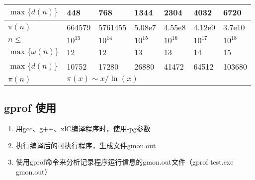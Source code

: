 \documentclass[twoside,twocolumn]{article}
\begin{document}
\begin{table}[H]
{\begin{tabular}{|l|llllll|}
$\max\{d(n)\}$      & \multicolumn{1}{l|}{448}                             & \multicolumn{1}{l|}{768}                             & \multicolumn{1}{l|}{1344}                            & \multicolumn{1}{l|}{2304}                              & \multicolumn{1}{l|}{4032}                            & 6720                           \\ \hline
$\pi(n)$            & \multicolumn{1}{l|}{664579}                          & \multicolumn{1}{l|}{5761455}                         & \multicolumn{1}{l|}{5.08e7}                          & \multicolumn{1}{l|}{4.55e8}                            & \multicolumn{1}{l|}{4.12e9}                          & 3.7e10                         \\ \hline
\rowcolor[HTML]{C0C0C0} 
$n\le$              & \multicolumn{1}{l|}{\cellcolor[HTML]{C0C0C0}$10^{13}$} & \multicolumn{1}{l|}{\cellcolor[HTML]{C0C0C0}$10^{14}$} & \multicolumn{1}{l|}{\cellcolor[HTML]{C0C0C0}$10^{15}$} & \multicolumn{1}{l|}{\cellcolor[HTML]{C0C0C0}$10^{16}$}   & \multicolumn{1}{l|}{\cellcolor[HTML]{C0C0C0}$10^{17}$} & $10^{18}$                        \\ \hline
$\max\{\omega(n)\}$ & \multicolumn{1}{l|}{12}                              & \multicolumn{1}{l|}{12}                              & \multicolumn{1}{l|}{13}                              & \multicolumn{1}{l|}{13}                                & \multicolumn{1}{l|}{14}                              & 15                             \\ \hline
$\max\{d(n)\}$      & \multicolumn{1}{l|}{10752}                           & \multicolumn{1}{l|}{17280}                           & \multicolumn{1}{l|}{26880}                           & \multicolumn{1}{l|}{41472}                             & \multicolumn{1}{l|}{64512}                           & 103680                         \\ \hline
$\pi(n)$            & \multicolumn{6}{l|}{$\pi(x)\sim x/\ln(x)$}                                                                                                                                                                                                                                                                          \\ \hline
\end{tabular}
}
\end{table}

\subsection{gprof 使用}
\begin{enumerate}
    \item 用gcc、g++、xlC编译程序时，使用-pg参数
    \item 执行编译后的可执行程序，生成文件gmon.out
    \item 使用gprof命令来分析记录程序运行信息的gmon.out文件（gprof test.exe gmon.out） 
\end{enumerate}
\end{document}
